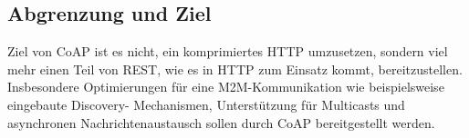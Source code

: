 \subsection{Abgrenzung und Ziel}
Ziel von \ac{CoAP} ist es nicht, ein komprimiertes \ac{HTTP} umzusetzen, sondern viel mehr einen
Teil von \ac{REST}, wie es in \ac{HTTP} zum Einsatz kommt, bereitzustellen.
Insbesondere Optimierungen für eine \ac{M2M}-Kommunikation wie beispielsweise eingebaute Discovery-
Mechanismen, Unterstützung für Multicasts und asynchronen Nachrichtenaustausch sollen durch
\ac{CoAP} bereitgestellt werden.